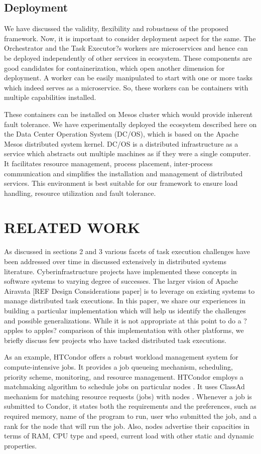 \documentclass[review]{elsarticle}
\begin{document}
\subsection{Deployment}
We have discussed the validity, flexibility and robustness of the proposed framework. Now, it is important to consider deployment aspect for the same. The Orchestrator and the Task Executor?s workers are microservices and hence can be deployed independently of other services in ecosystem. These components are good candidates for containerization, which open another dimension for deployment. A worker can be easily manipulated to start with one or more tasks which indeed serves as a microservice. So, these workers can be containers with multiple capabilities installed. 

These containers can be installed on Mesos cluster which would provide inherent fault tolerance. We have experimentally deployed the ecosystem described here on the Data Center Operation System (DC/OS), which is based on the Apache Mesos distributed system kernel. DC/OS is a distributed infrastructure as a service which abstracts out multiple machines as if they were a single computer. It facilitates resource management, process placement, inter-process communication and simplifies the installation and management of distributed services. This environment is best suitable for our framework to ensure load handling, resource utilization and fault tolerance.  


\section{RELATED WORK}

As discussed in sections 2 and 3 various facets of task execution challenges have been addressed over time in discussed extensively in distributed systems literature. Cyberinfrastructure projects have implemented these concepts in software systems to varying degree of successes. The larger vision of Apache Airavata [REF Design Considerations paper] is to leverage on existing systems to manage distributed task executions. In this paper, we share our experiences in building a particular implementation which will help us identify the challenges and possible generalizations. While it is not appropriate at this point to do a ?apples to apples? comparison of this implementation with other platforms, we briefly discuss few projects who have tacked distributed task executions. 

As an example, HTCondor offers a robust workload management system for compute-intensive jobs. It provides a job queueing mechanism, scheduling, priority scheme, monitoring, and resource management. HTCondor employs a matchmaking algorithm to schedule jobs on particular nodes \cite{coleman2001implementation}. It uses ClassAd mechanism for matching resource requests (jobs) with nodes \cite{coleman2003distributed}. Whenever a job is submitted to Condor, it states both the requirements and the preferences, such as required memory, name of the program to run, user who submitted the job, and a rank for the node that will run the job. Also, nodes advertise their capacities in terms of RAM, CPU type and speed, current load with other static and dynamic properties.
\end{document}
